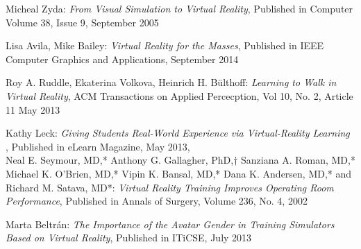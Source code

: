 \documentclass[10pt]{report}
\begin{document}
\begin{bibliography}{9}

  	Micheal Zyda:
  	\emph{From Visual Simulation to Virtual Reality},
  	Published in Computer Volume 38, Issue 9,
  	September 2005
  	
  	Lisa Avila, Mike Bailey:
  	\emph{Virtual Reality for the Masses},
  	Published in IEEE Computer Graphics and Applications,
  	September 2014
  	
  	Roy A. Ruddle, Ekaterina Volkova, Heinrich H. Bülthoff:
  	\emph{Learning to Walk in Virtual Reality},
  	ACM Transactions on Applied Percecption, Vol 10, No. 2, Article 11
  	May 2013
  	
  	Kathy Leck:
  	\emph{Giving Students Real-World Experience via Virtual-Reality Learning },
  	Published in eLearn Magazine,
  	May 2013, \\
  	\hyperlink{http://elearnmag.acm.org/archive.cfm?aid=2484903}
  	
  	Neal E. Seymour, MD,* Anthony G. Gallagher, PhD,† Sanziana A. Roman, MD,* Michael K. O’Brien, MD,* Vipin K. Bansal, MD,*
Dana K. Andersen, MD,* and Richard M. Satava, MD*:
  	\emph{Virtual Reality Training Improves Operating Room Performance},
  	Published in Annals of Surgery,
  	Volume 236, No. 4,
  	2002

  	Marta Beltrán:
  	\emph{The Importance of the Avatar Gender in Training Simulators Based on Virtual Reality},
  	Published in ITiCSE,
  	July 2013
  	

\end{bibliography}	
	
\end{document}
